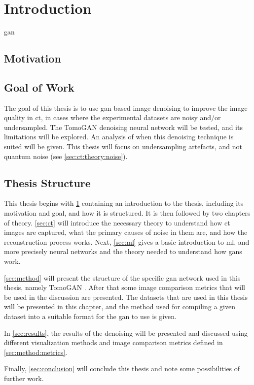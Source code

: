\chapter{Introduction}
\label{sec:introduction}
\todo[inline]{}
\Gls{gan}

\section{Motivation}

\section{Goal of Work}
\todo[inline]{}
The goal of this thesis is to use \gls{gan} based image denoising to improve the image quality in \gls{ct}, in cases where the experimental datasets are noisy and/or undersampled. The TomoGAN \cite{liu2020tomogan} denoising neural network will be tested, and its limitations will be explored. An analysis of when this denoising technique is suited will be given. This thesis will focus on undersampling artefacts, and not quantum noise (see \cref{sec:ct:theory:noise}). 

\section{Thesis Structure}
This thesis begins with \cref{sec:introduction} containing an introduction to the thesis, including its motivation and goal, and how it is structured. It is then followed by two chapters of theory. \cref{sec:ct} will introduce the necessary theory to understand how \gls{ct} images are captured, what the primary causes of noise in them are, and how the reconstruction process works. Next, \cref{sec:ml} gives a basic introduction to \gls{ml}, and more precisely neural networks and the theory needed to understand how \gls{gan}s work. 

\cref{sec:method} will present the structure of the specific \gls{gan} network used in this thesis, namely TomoGAN \cite{liu2020tomogan}. After that some image comparison metrics that will be used in the discussion are presented. The datasets that are used in this thesis will be presented in this chapter, and the method used for compiling a given dataset into a suitable format for the \gls{gan} to use is given. 

In \cref{sec:results}, the results of the denoising will be presented and discussed using different visualization methods and image comparison metrics defined in \cref{sec:method:metrics}.

Finally, \cref{sec:conclusion} will conclude this thesis and note some possibilities of further work. 